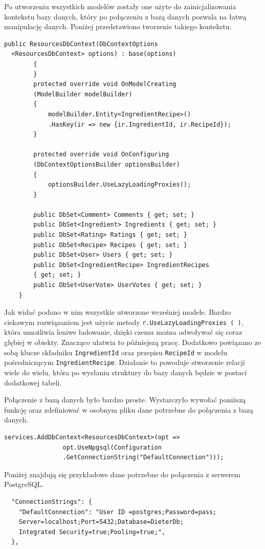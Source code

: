 Po utworzeniu wszystkich modelów zostały one użyte do zainicjalizowania kontekstu bazy danych, który po połączeniu z bazą danych pozwala na łatwą manipulację danych. Poniżej przedstawiono tworzenie takiego kontekstu.

\begin{lstlisting}[language={[Sharp]C}]
  public ResourcesDbContext(DbContextOptions
  <ResourcesDbContext> options) : base(options)
        {
        }
        protected override void OnModelCreating
        (ModelBuilder modelBuilder)
        {
            modelBuilder.Entity<IngredientRecipe>()
            .HasKey(ir => new {ir.IngredientId, ir.RecipeId});
        }
        
        protected override void OnConfiguring
        (DbContextOptionsBuilder optionsBuilder)
        {
            optionsBuilder.UseLazyLoadingProxies();
        }

        public DbSet<Comment> Comments { get; set; }
        public DbSet<Ingredient> Ingredients { get; set; }
        public DbSet<Rating> Ratings { get; set; }
        public DbSet<Recipe> Recipes { get; set; }
        public DbSet<User> Users { get; set; }
        public DbSet<IngredientRecipe> IngredientRecipes 
        { get; set; }
        public DbSet<UserVote> UserVotes { get; set; }
    }
\end{lstlisting}

Jak widać podano w nim wszystkie utworzone wcześniej modele. Bardzo ciekawym rozwiązaniem jest użycie metody \texttt{r.UseLazyLoadingProxies ( )}, która umożliwia leniwe ładowanie, dzięki czemu można odwoływać się coraz głębiej w obiekty. Znacząco ułatwia to późniejszą pracę. Dodatkowo powiązano ze sobą klucze składniku \texttt{IngredientId} oraz przepisu \texttt{RecipeId} w modelu pośredniczącym \texttt{IngredientRecipe}. Działanie to powoduje stworzenie relacji wiele do wielu, która po wysłaniu struktury do bazy danych będzie w postaci dodatkowej tabeli.\newline

Połączenie z bazą danych było bardzo proste. Wystarczyło wywołać poniższą funkcję oraz zdefiniować w osobnym pliku dane potrzebne do połączenia z bazą danych.
\begin{lstlisting}[language={[Sharp]C}]
 services.AddDbContext<ResourcesDbContext>(opt =>
                opt.UseNpgsql(Configuration
                .GetConnectionString("DefaultConnection")));
\end{lstlisting}
Poniżej znajdują się przykładowe dane potrzebne do połączenia z serwerem PostgreSQL.
\begin{lstlisting}
  "ConnectionStrings": {
    "DefaultConnection": "User ID =postgres;Password=pass;
    Server=localhost;Port=5432;Database=DieterDb;
    Integrated Security=true;Pooling=true;",
  },
\end{lstlisting}

